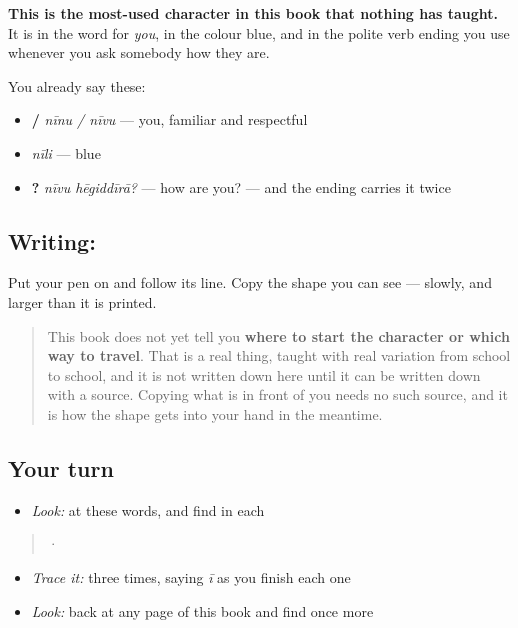 \textbf{This is the most-used character in this book that nothing has taught.} It is in the word for \emph{you}, in the colour blue, and in the polite verb ending you use whenever you ask somebody how they are.

You already say these:

\begin{itemize}
\raggedright
  \item \textbf{ / } \emph{nīnu / nīvu} — you, familiar and respectful
  \item \textbf{} \emph{nīli} — blue
  \item \textbf{ ?} \emph{nīvu hēgiddīrā?} — how are you? — and the ending carries it twice
\end{itemize}

\subsection*{Writing: }
Put your pen on  and follow its line. Copy the shape you can see — slowly, and larger than it is printed.

\begin{quote}
This book does not yet tell you \textbf{where to start the character or which way to travel}. That is a real thing, taught with real variation from school to school, and it is not written down here until it can be written down with a source. Copying what is in front of you needs no such source, and it is how the shape gets into your hand in the meantime.
\end{quote}

\subsection*{Your turn}
\begin{itemize}
\raggedright
  \item \emph{Look:} at these words, and find  in each
\end{itemize}

\begin{quote}
  ·  
\end{quote}

\begin{itemize}
\raggedright
  \item \emph{Trace it:}  three times, saying \emph{ī} as you finish each one
  \item \emph{Look:} back at any page of this book and find  once more
\end{itemize}

